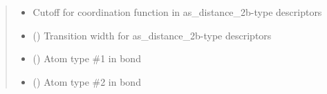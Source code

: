 \documentclass[letterpaper,10pt,english]{sphinxmanual}
\begin{document}
\begin{fulllineitems}
\begin{quote}
\begin{description}
\begin{itemize}
\item {} 
 \textendash{} Cutoff for coordination function in as\_distance\_2b-type descriptors

\item {} 
 () \textendash{} Transition width for as\_distance\_2b-type descriptors

\item {} 
 () \textendash{} Atom type \#1 in bond

\item {} 
 () \textendash{} Atom type \#2 in bond

\end{itemize}

\end{description}\end{quote}

\end{fulllineitems}

\end{document}
